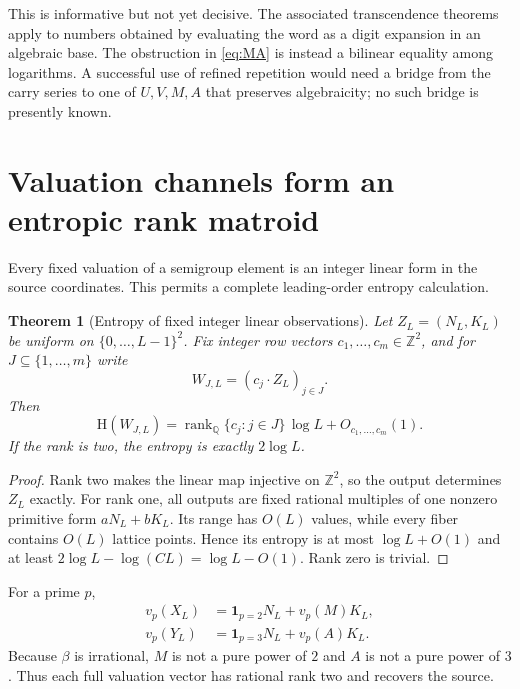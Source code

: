 \documentclass[11pt,oneside]{article}
\newtheorem{theorem}{Theorem}[section]
\theoremstyle{definition}
\theoremstyle{remark}
\newcommand{\Q}{\mathbb{Q}}
\newcommand{\Z}{\mathbb{Z}}
\newcommand{\HH}{\mathrm{H}}
\newcommand{\rank}{\operatorname{rank}}
\begin{document}
This is informative but not yet decisive.  The associated transcendence theorems apply to numbers obtained by evaluating the word as a digit expansion in an algebraic base.  The obstruction in \eqref{eq:MA} is instead a bilinear equality among logarithms.  A successful use of refined repetition would need a bridge from the carry series to one of $U,V,M,A$ that preserves algebraicity; no such bridge is presently known.

\section{Valuation channels form an entropic rank matroid}\label{sec:valuation-entropy}

Every fixed valuation of a semigroup element is an integer linear form in the source coordinates.  This permits a complete leading-order entropy calculation.

\begin{theorem}[Entropy of fixed integer linear observations]\label{thm:linear-observations}
Let $Z_L=(N_L,K_L)$ be uniform on $\{0,\ldots,L-1\}^2$.  Fix integer row vectors $c_1,\ldots,c_m\in\Z^2$, and for $J\subseteq\{1,\ldots,m\}$ write
\[
 W_{J,L}=(c_j\cdot Z_L)_{j\in J}.
\]
Then
\begin{equation}\label{eq:rank-entropy}
 \HH(W_{J,L})=\rank_{\Q}\{c_j:j\in J\}\,\log L+O_{c_1,\ldots,c_m}(1).
\end{equation}
If the rank is two, the entropy is exactly $2\log L$.
\end{theorem}

\begin{proof}
Rank two makes the linear map injective on $\Z^2$, so the output determines $Z_L$ exactly.  For rank one, all outputs are fixed rational multiples of one nonzero primitive form $aN_L+bK_L$.  Its range has $O(L)$ values, while every fiber contains $O(L)$ lattice points.  Hence its entropy is at most $\log L+O(1)$ and at least
$2\log L-\log(CL)=\log L-O(1)$.  Rank zero is trivial.
\end{proof}

For a prime $p$,
\begin{align}
 v_p(X_L)&=\mathbf1_{p=2}N_L+v_p(M)K_L,\label{eq:vX}\\
 v_p(Y_L)&=\mathbf1_{p=3}N_L+v_p(A)K_L.\label{eq:vY}
\end{align}
Because $\beta$ is irrational, $M$ is not a pure power of $2$ and $A$ is not a pure power of $3$.  Thus each full valuation vector has rational rank two and recovers the source.
\end{document}
